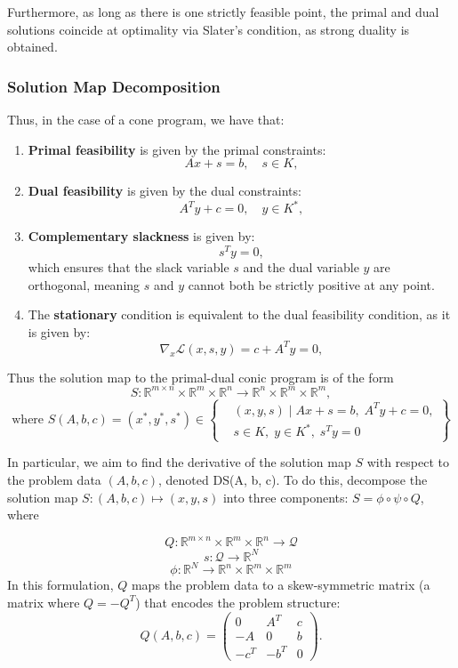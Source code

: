 \documentclass{article}
\begin{document}
Furthermore, as long as there is one strictly feasible point, the primal and dual solutions coincide at optimality via Slater's condition, as strong duality is obtained.

\subsubsection{Solution Map Decomposition}

Thus, in the case of a cone program, we have that:

\begin{enumerate}
    \item \textbf{Primal feasibility} is given by the primal constraints:
    \[
    A x + s = b, \quad s \in K,
    \]

    \item \textbf{Dual feasibility} is given by the dual constraints:
    \[
    A^T y + c = 0, \quad y \in K^*,
    \]
    
    \item \textbf{Complementary slackness} is given by:
    \[
    s^T y = 0,
    \]
    which ensures that the slack variable \( s \) and the dual variable \( y \) are orthogonal, meaning \( s \) and \( y \) cannot both be strictly positive at any point.

    \item The \textbf{stationary} condition is equivalent to the dual feasibility condition, as it is given by:
    \[
    \nabla_x \mathcal{L}(x, s, y) = c + A^T y = 0,
    \]
\end{enumerate}

Thus the solution map to the primal-dual conic program is of the form 
\[
S: \mathbb{R}^{m \times n} \times \mathbb{R}^m \times \mathbb{R}^n \to \mathbb{R}^n \times \mathbb{R}^m \times \mathbb{R}^m,
\]
\[
\text{where } S(A, b, c) = (x^*, y^*, s^*) \in 
\left\{
\begin{aligned}
    & (x, y, s) \mid A x + s = b, \; A^T y + c = 0, \\
    & s \in K, \; y \in K^*, \; s^T y = 0
\end{aligned}
\right\}
\]

In particular, we aim to find the derivative of the solution map \(S\) with respect to the problem data \((A, b, c)\), denoted DS(A, b, c). To do this, decompose the solution map \(S: (A,b,c) \mapsto (x,y,s)\) into three components: \(S = \phi \circ \psi \circ Q\), where

\[
Q : \mathbb{R}^{m \times n} \times \mathbb{R}^m \times \mathbb{R}^n \to \mathcal{Q}
\]
\[
s : \mathcal{Q} \to \mathbb{R}^N
\]
\[
\phi : \mathbb{R}^N \to \mathbb{R}^n \times \mathbb{R}^m \times \mathbb{R}^m
\]In this formulation, $Q$ maps the problem data to a skew-symmetric matrix (a matrix where \(Q = -Q^T\)) that encodes the problem structure:
\begin{equation}
Q(A,b,c) = \begin{pmatrix} 
0 & A^T & c \\
-A & 0 & b \\
-c^T & -b^T & 0
\end{pmatrix}.
\end{equation}
\end{document}

